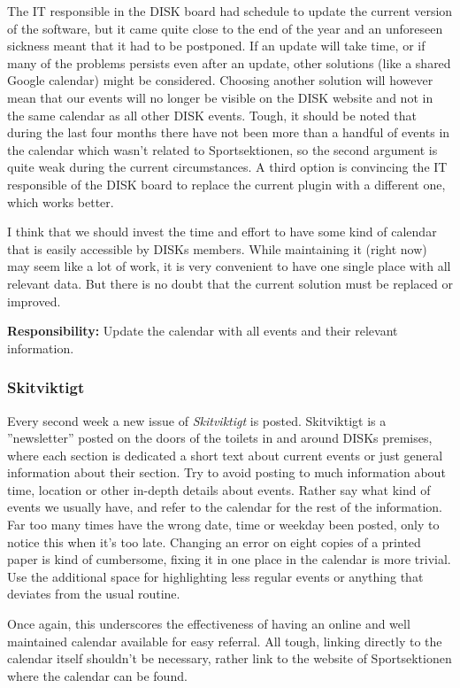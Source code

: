 \documentclass[12pt,a4paper]{article}
\begin{document}
			The IT responsible in the DISK board had schedule to update the current version of the software, but it came quite close to the end of the year and an unforeseen sickness meant that it had to be postponed. If an update will take time, or if many of the problems persists even after an update, other solutions (like a shared Google calendar) might be considered. Choosing another solution will however mean that our events will no longer be visible on the DISK website and not in the same calendar as all other DISK events. Tough, it should be noted that during the last four months there have not been more than a handful of events in the calendar which wasn't related to Sportsektionen, so the second argument is quite weak during the current circumstances. A third option is convincing the IT responsible of the DISK board to replace the current plugin with a different one, which works better.

			I think that we should invest the time and effort to have some kind of calendar that is easily accessible by DISKs members. While maintaining it (right now) may seem like a lot of work, it is very convenient to have one single place with all relevant data. But there is no doubt that the current solution must be replaced or improved.

			\textbf{Responsibility:} Update the calendar with all events and their relevant information.
			\subsubsection{Skitviktigt}
			Every second week a new issue of \emph{Skitviktigt} is posted. Skitviktigt is a ''newsletter'' posted on the doors of the toilets in and around DISKs premises, where each section is dedicated a short text about current events or just general information about their section. Try to avoid posting to much information about time, location or other in-depth details about events. Rather say what kind of events we usually have, and refer to the calendar for the rest of the information. Far too many times have the wrong date, time or weekday been posted, only to notice this when it's too late. Changing an error on eight copies of a printed paper is kind of cumbersome, fixing it in one place in the calendar is more trivial. Use the additional space for highlighting less regular events or anything that deviates from the usual routine.

			Once again, this underscores the effectiveness of having an online and well maintained calendar available for easy referral. All tough, linking directly to the calendar itself shouldn't be necessary, rather link to the website of Sportsektionen where the calendar can be found.
\end{document}
